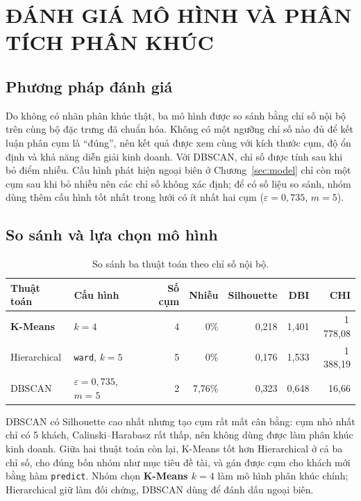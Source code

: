 \documentclass[../report.tex]{subfiles}
\begin{document}
\newpage
\section{ĐÁNH GIÁ MÔ HÌNH VÀ PHÂN TÍCH PHÂN KHÚC}
\label{sec:eval}

\subsection{Phương pháp đánh giá}

Do không có nhãn phân khúc thật, ba mô hình được so sánh bằng chỉ số nội bộ trên cùng bộ đặc trưng đã chuẩn hóa. Không có một ngưỡng chỉ số nào đủ để kết luận phân cụm là ``đúng'', nên kết quả được xem cùng với kích thước cụm, độ ổn định và khả năng diễn giải kinh doanh. Với DBSCAN, chỉ số được tính sau khi bỏ điểm nhiễu. Cấu hình phát hiện ngoại biên ở Chương~\ref{sec:model} chỉ còn một cụm sau khi bỏ nhiễu nên các chỉ số không xác định; để có số liệu so sánh, nhóm dùng thêm cấu hình tốt nhất trong lưới có ít nhất hai cụm ($\varepsilon = 0,735$, $m = 5$).

\subsection{So sánh và lựa chọn mô hình}

\begin{table}[H]
\centering
\small
\begin{tabular}{@{}llrrrrr@{}}
\toprule
\textbf{Thuật toán} & \textbf{Cấu hình} & \textbf{Số cụm} & \textbf{Nhiễu} & \textbf{Silhouette} & \textbf{DBI} & \textbf{CHI} \\
\midrule
\textbf{K-Means} & $k=4$ & 4 & 0\% & 0,218 & 1,401 & 1\,778,08 \\
Hierarchical & \texttt{ward}, $k=5$ & 5 & 0\% & 0,176 & 1,533 & 1\,388,19 \\
DBSCAN & $\varepsilon=0,735$, $m=5$ & 2 & 7,76\% & 0,323 & 0,648 & 16,66 \\
\bottomrule
\end{tabular}
\caption{So sánh ba thuật toán theo chỉ số nội bộ.}
\label{tab:compare}
\end{table}

DBSCAN có Silhouette cao nhất nhưng tạo cụm rất mất cân bằng: cụm nhỏ nhất chỉ có 5 khách, Calinski--Harabasz rất thấp, nên không dùng được làm phân khúc kinh doanh. Giữa hai thuật toán còn lại, K-Means tốt hơn Hierarchical ở cả ba chỉ số, cho đúng bốn nhóm như mục tiêu đề tài, và gán được cụm cho khách mới bằng hàm \texttt{predict}. Nhóm chọn \textbf{K-Means $k = 4$} làm mô hình phân khúc chính; Hierarchical giữ làm đối chứng, DBSCAN dùng để đánh dấu ngoại biên.
\end{document}
